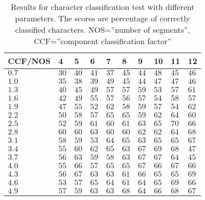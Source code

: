 \begin{table}[htb]
  \begin{center}
  \begin{tabular}{ l | l l l l l l l l l }
    CCF/NOS & 4   & 5    & 6    & 7    & 8    & 9    & 10   & 11 & 12 \\ \hline
    $0.7$  & $30$ & $40$ & $41$ & $37$ & $45$ & $44$ & $48$ & $45$ & $46$\\ 
    $1.0$  & $35$ & $38$ & $39$ & $49$ & $45$ & $44$ & $47$ & $47$ & $46$\\ 
    $1.3$  & $40$ & $45$ & $49$ & $57$ & $57$ & $59$ & $53$ & $57$ & $61$\\
    $1.6$  & $42$ & $49$ & $55$ & $57$ & $56$ & $57$ & $54$ & $58$ & $57$\\   
    $1.9$  & $47$ & $55$ & $52$ & $62$ & $58$ & $59$ & $57$ & $54$ & $62$\\  
    $2.2$  & $50$ & $58$ & $57$ & $65$ & $65$ & $59$ & $62$ & $64$ & $60$\\ 
    $2.5$  & $52$ & $59$ & $61$ & $60$ & $61$ & $63$ & $65$ & \textbf{$70$} & $66$\\ 
    $2.8$  & $60$ & $60$ & $63$ & $60$ & $60$ & $62$ & $62$ & $64$ & $68$\\ 
    $3.1$  & $58$ & $59$ & $53$ & $64$ & $65$ & $63$ & $65$ & $65$ & $67$\\ 
    $3.4$  & $55$ & $60$ & $62$ & $65$ & $63$ & $67$ & $69$ & $68$ & $47$\\ 
    $3.7$  & $56$ & $63$ & $59$ & $58$ & $63$ & $67$ & $67$ & $64$ & $45$\\ 
    $4.0$  & $55$ & $66$ & $57$ & $65$ & $65$ & $67$ & $66$ & $67$ & $66$\\
    $4.3$  & $56$ & $67$ & $63$ & $63$ & $61$ & $66$ & $65$ & $65$ & $69$\\
    $4.6$  & $53$ & $57$ & $65$ & $64$ & $61$ & $64$ & $65$ & $69$ & $66$\\
    $4.9$  & $57$ & $59$ & $63$ & $63$ & $68$ & $64$ & $66$ & $68$ & $67$\\
  \end{tabular}
\end{center}
\caption{Results for character classification test with different parameters. The scores are percentage of correctly classified characters.
	 NOS=''number of segments'',
         CCF=''component classification factor''}
\label{tab:word_classifier_results_generated_data} 
\end{table}

